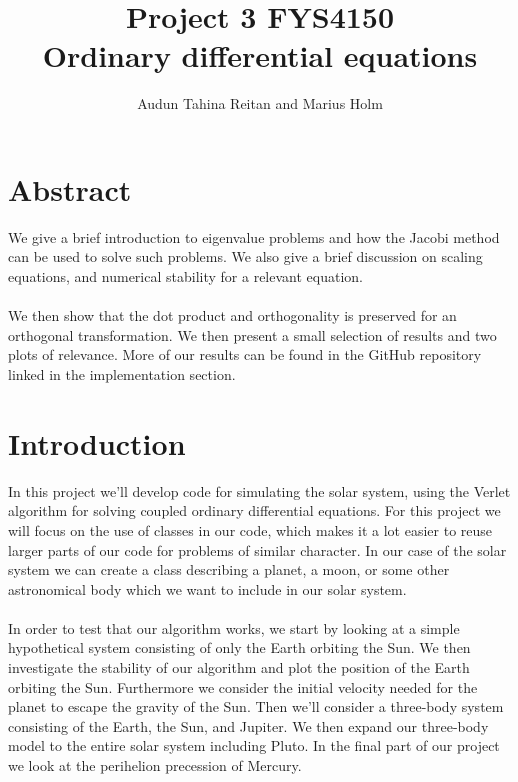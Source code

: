 \documentclass[a4paper, fontsize=11pt]{article}
\begin{document}
\title{Project 3 FYS4150 \\ Ordinary differential equations}
\author{Audun Tahina Reitan and Marius Holm}

\maketitle


\section{Abstract}
We give a brief introduction to eigenvalue problems and how the Jacobi method can be used to solve such problems. We also give a brief discussion on scaling equations, and numerical stability for a relevant equation.

\paragraph{}
We then show that the dot product and orthogonality is preserved for an orthogonal transformation. We then present a small selection of results and two plots of relevance. More of our results can be found in the GitHub repository linked in the implementation section. 

\section{Introduction}
In this project we'll develop code for simulating the solar system, using the Verlet algorithm for solving coupled ordinary differential equations. For this project we will focus on the use of classes in our code, which makes it a lot easier to reuse larger parts of our code for problems of similar character. In our case of the solar system we can create a class describing a planet, a moon, or some other astronomical body which we want to include in our solar system.


\paragraph{}
In order to test that our algorithm works, we start by looking at a simple hypothetical system consisting of only the Earth orbiting the Sun. We then investigate the stability of our algorithm and plot the position of the Earth orbiting the Sun. Furthermore we consider the initial velocity needed for the planet to escape the gravity of the Sun. Then we'll consider a three-body system consisting of the Earth, the Sun, and Jupiter. We then expand our three-body model to the entire solar system including Pluto. In the final part of our project we look at the perihelion precession of Mercury.
\end{document}
